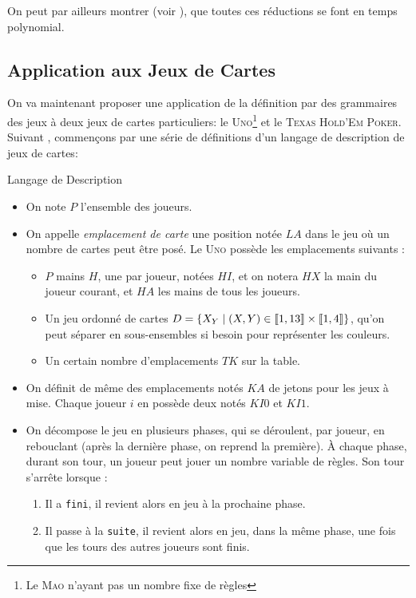 \documentclass{cours}
\begin{document}
On peut par ailleurs montrer (voir \cite{cfgames}), que toutes ces réductions se font en temps polynomial. 

\subsection{Application aux Jeux de Cartes}
On va maintenant proposer une application de la définition par des grammaires des jeux à deux jeux de cartes particuliers: le \textsc{Uno}\footnote{Le \textsc{Mao} n'ayant pas un nombre fixe de règles} et le \textsc{Texas Hold'Em Poker}. Suivant \cite{card-game-lang}, commençons par une série de définitions d'un langage de description de jeux de cartes: 
\begin{définition}{Langage de Description}{}
    \begin{itemize}
        \item On note $P$ l'ensemble des joueurs.
        \item On appelle \emph{emplacement de carte} une position notée $LA$ dans le jeu où un nombre de cartes peut être posé. Le \textsc{Uno} possède les emplacements suivants : 
        \begin{itemize}
            \item $P$ mains $H$, une par joueur, notées $HI$, et on notera $HX$ la main du joueur courant, et $HA$ les mains de tous les joueurs. 
            \item Un jeu ordonné de cartes $D = \left\{X_{Y} \mid \left(X, Y\right)\in \left\llbracket 1, 13\right\rrbracket \times \left\llbracket 1, 4\right\rrbracket\right\}$, qu'on peut séparer en sous-ensembles si besoin pour représenter les couleurs.
            \item Un certain nombre d'emplacements $TK$ sur la table. 
        \end{itemize}
        \item On définit de même des emplacements notés $KA$ de jetons pour les jeux à mise. Chaque joueur $i$ en possède deux notés $KI0$ et $KI1$. 
        \item On décompose le jeu en plusieurs phases, qui se déroulent, par joueur, en rebouclant (après la dernière phase, on reprend la première). À chaque phase, durant son tour, un joueur peut jouer un nombre variable de règles. Son tour s'arrête lorsque : 
        \begin{enumerate}
            \item Il a \texttt{fini}, il revient alors en jeu à la prochaine phase.
            \item Il passe à la \texttt{suite}, il revient alors en jeu, dans la même phase, une fois que les tours des autres joueurs sont finis. 

\end{enumerate}
\end{itemize}
\end{définition}
\end{document}
